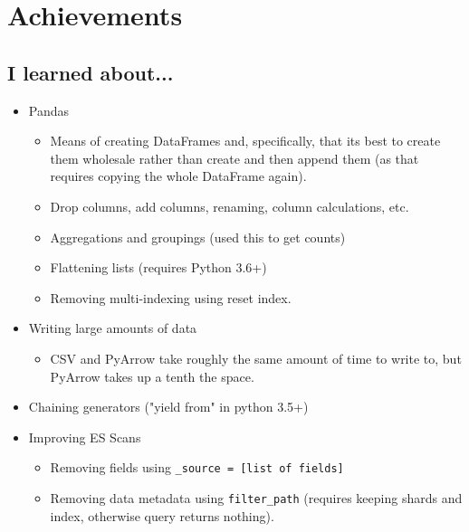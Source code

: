 \documentclass{weeklyreport}
\begin{document}
\section*{Achievements}
\subsection*{I learned about...}
\begin{itemize}
	\item Pandas
	\begin{itemize}
		\item Means of creating DataFrames and, specifically, that its best to create them wholesale rather than create and then append them (as that requires copying the whole DataFrame again).
		\item Drop columns, add columns, renaming, column calculations, etc.
		\item Aggregations and groupings (used this to get counts)
		\item Flattening lists (requires Python 3.6+)
		\item Removing multi-indexing using reset index.
	\end{itemize}
	\item Writing large amounts of data
	\begin{itemize}
		\item CSV and PyArrow take roughly the same amount of time to write to, but PyArrow takes up a tenth the space.
	\end{itemize}
	\item Chaining generators ("yield from" in python 3.5+)
	\item Improving ES Scans
	\begin{itemize}
		\item Removing fields using \texttt{\_source = [list of fields]}
		\item Removing data metadata using \texttt{filter\_path} (requires keeping shards and index, otherwise query returns nothing).
	\end{itemize}
\end{itemize}
\end{document}
